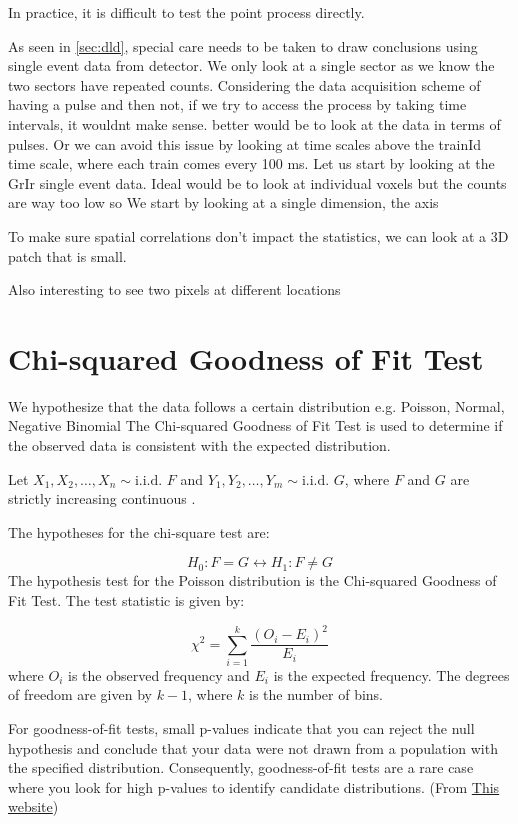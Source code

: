 In practice, it is difficult to test the point process directly. 

As seen in \cref{sec:dld}, special care needs to be taken to draw conclusions using single event data from detector.
We only look at a single sector as we know the two sectors have repeated counts.
Considering the data acquisition scheme of having a pulse and then not, if we try to access the process by taking time intervals, it wouldnt make sense. better would be to look at the data in terms of pulses.
Or we can avoid this issue by looking at time scales above the trainId time scale, where each train comes every 100 ms.
Let us start by looking at the \gls{GrIr} single event data. Ideal would be to look at individual voxels but the counts are way too low so We start by looking at a single dimension, the  axis

To make sure spatial correlations don't impact the statistics, we can look at a 3D patch that is small.

Also interesting to see two pixels at different locations

\section{Chi-squared Goodness of Fit Test}
We hypothesize that the data follows a certain distribution e.g. Poisson, Normal, Negative Binomial The Chi-squared Goodness of Fit Test is used to determine if the observed data is consistent with the expected distribution.

Let \( X_1, X_2, \ldots, X_n \sim \text{i.i.d. } F \) and \( Y_1, Y_2, \ldots, Y_m \sim \text{i.i.d. } G \), where \( F \) and \( G \) are strictly increasing continuous .

The hypotheses for the chi-square test are:

\begin{equation}
    H_0: F = G \leftrightarrow   H_1: F \neq G
\end{equation}
The hypothesis test for the Poisson distribution is the Chi-squared Goodness of Fit Test. The test statistic is given by:

\begin{equation}
    \chi^2 = \sum_{i=1}^{k} \frac{(O_i - E_i)^2}{E_i}
\end{equation}
where \(O_i\) is the observed frequency and \(E_i\) is the expected frequency. The degrees of freedom are given by \(k-1\), where \(k\) is the number of bins.

For goodness-of-fit tests, small p-values indicate that you can reject the null hypothesis and conclude that your data were not drawn from a population with the specified distribution. Consequently, goodness-of-fit tests are a rare case where you look for high p-values to identify candidate distributions. 
(From \href{https://statisticsbyjim.com/hypothesis-testing/goodness-fit-tests-discrete-distributions/}{This website})


